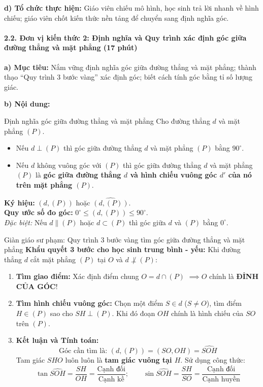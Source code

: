 \documentclass[12pt, a4paper]{article}
\begin{document}
\noindent \textbf{d) Tổ chức thực hiện:}
Giáo viên chiếu mô hình, học sinh trả lời nhanh về hình chiếu; giáo viên chốt kiến thức nền tảng để chuyển sang định nghĩa góc.

\paragraph{2.2. Đơn vị kiến thức 2: Định nghĩa và Quy trình xác định góc giữa đường thẳng và mặt phẳng (17 phút)}

\noindent \textbf{a) Mục tiêu:}
Nắm vững định nghĩa góc giữa đường thẳng và mặt phẳng; thành thạo ``Quy trình 3 bước vàng'' xác định góc; biết cách tính góc bằng tỉ số lượng giác.

\noindent \textbf{b) Nội dung:}
\begin{pedabox}{Định nghĩa góc giữa đường thẳng và mặt phẳng}
Cho đường thẳng $d$ và mặt phẳng $(P)$.
\begin{itemize}[leftmargin=0.6cm]
    \item Nếu $d \perp (P)$ thì góc giữa đường thẳng $d$ và mặt phẳng $(P)$ bằng $90^\circ$.
    \item Nếu $d$ không vuông góc với $(P)$ thì góc giữa đường thẳng $d$ và mặt phẳng $(P)$ là \textbf{góc giữa đường thẳng $d$ và hình chiếu vuông góc $d'$ của nó trên mặt phẳng $(P)$}.
\end{itemize}
\textbf{Ký hiệu:} $(d, (P))$ hoặc $\widehat{(d, (P))}$. \\
\textbf{Quy ước số đo góc:} $0^\circ \le (d, (P)) \le 90^\circ$. \\
\textit{Đặc biệt:} Nếu $d \parallel (P)$ hoặc $d \subset (P)$ thì góc giữa $d$ và $(P)$ bằng $0^\circ$.
\end{pedabox}

\begin{scaffoldbox}{Giàn giáo sư phạm: Quy trình 3 bước vàng tìm góc giữa đường thẳng và mặt phẳng}
\textbf{Khẩu quyết 3 bước cho học sinh trung bình - yếu:}
Khi đường thẳng $d$ cắt mặt phẳng $(P)$ tại $O$ và $d \not\perp (P)$:
\begin{enumerate}[leftmargin=0.8cm]
    \item[\textbf{Bước 1:}] \textbf{Tìm giao điểm:} Xác định điểm chung $O = d \cap (P)$ $\implies O$ chính là \textbf{ĐỈNH CỦA GÓC}!
    \item[\textbf{Bước 2:}] \textbf{Tìm hình chiếu vuông góc:} Chọn một điểm $S \in d$ ($S \neq O$), tìm điểm $H \in (P)$ sao cho $SH \perp (P)$. Khi đó đoạn $OH$ chính là hình chiếu của $SO$ trên $(P)$.
    \item[\textbf{Bước 3:}] \textbf{Kết luận và Tính toán:}
    $$\text{Góc cần tìm là: } (d, (P)) = (SO, OH) = \widehat{SOH}$$
    Tam giác $SHO$ luôn luôn là \textbf{tam giác vuông tại $H$}. Sử dụng công thức:
    $$\tan \widehat{SOH} = \dfrac{SH}{OH} = \dfrac{\text{Cạnh đối}}{\text{Cạnh kề}}; \qquad \sin \widehat{SOH} = \dfrac{SH}{SO} = \dfrac{\text{Cạnh đối}}{\text{Cạnh huyền}}$$
\end{enumerate}
\end{scaffoldbox}
\end{document}
